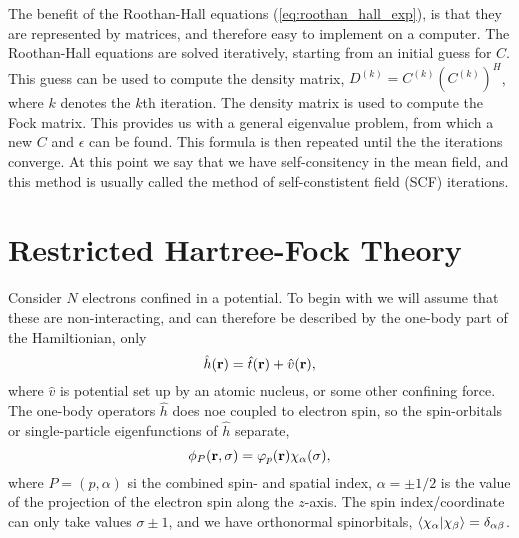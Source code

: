The benefit of the Roothan-Hall equations (\autoref{eq:roothan_hall_exp}), is that they 
are represented by matrices, and therefore easy to implement on a computer. The
Roothan-Hall equations are solved iteratively, starting from an initial guess for $C$. 
This guess can be used to compute the density matrix, 
$D^{(k)} = C^{(k)}(C^{(k)})^H$, where $k$ denotes the $k$th iteration. The density 
matrix is used to compute the Fock matrix. This provides us with a general eigenvalue 
problem, from which a new $C$ and $\epsilon$ can be found. This formula is then repeated
until the the iterations converge. At this point we say that we have self-consitency 
in the mean field, and this method is usually called the method of self-constistent
field (SCF) iterations.

\section{Restricted Hartree-Fock Theory}

Consider $N$ electrons confined in a potential. 
To begin with we will assume that these are non-interacting, and can therefore be 
described by the one-body part of the Hamiltionian, only
\begin{equation}
    \hat{h}(\vb{r}) = \hat{t}(\vb{r}) + \hat{v}(\vb{r}),
\end{equation}
where $\hat{v}$ is potential set up by an atomic nucleus, or some other confining
force. The one-body operators $\hat{h}$ does noe coupled to electron spin, so the 
spin-orbitals or single-particle eigenfunctions of $\hat{h}$ separate,
\begin{equation}
    \phi_P(\vb{r}, \sigma) = \varphi_p(\vb{r})\chi_\alpha(\sigma),
\end{equation}
where $P = (p, \alpha)$ si the combined spin- and spatial index, $\alpha = \pm 1/2$
is the value of the projection of the electron spin along the $z$-axis. The spin 
index/coordinate can only take values $\sigma \pm 1$, and we have orthonormal 
spinorbitals, $\braket{\chi_\alpha}{\chi_\beta} = \delta_{\alpha\beta}$. 

